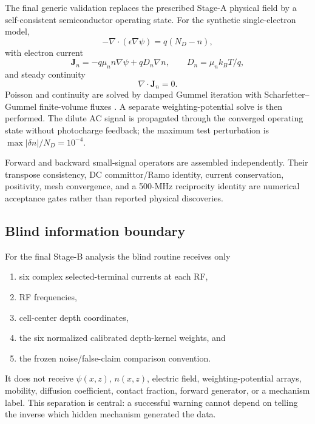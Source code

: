 \documentclass[11pt]{article}
\begin{document}
The final generic validation replaces the prescribed Stage-A physical field by a self-consistent semiconductor operating state. For the synthetic single-electron model,
\begin{equation}
-\nabla\!\cdot(\epsilon\nabla\psi)=q(N_D-n),
\label{eq:poisson}
\end{equation}
with electron current
\begin{equation}
\bm J_n=-q\mu_n n\nabla\psi+qD_n\nabla n,
\qquad D_n=\mu_n k_BT/q,
\label{eq:current}
\end{equation}
and steady continuity
\begin{equation}
\nabla\!\cdot\bm J_n=0.
\label{eq:continuity}
\end{equation}
Poisson and continuity are solved by damped Gummel iteration with Scharfetter--Gummel finite-volume fluxes \cite{Gummel1964,ScharfetterGummel1969}. A separate weighting-potential solve is then performed. The dilute AC signal is propagated through the converged operating state without photocharge feedback; the maximum test perturbation is $\max|\delta n|/N_D=10^{-4}$.

Forward and backward small-signal operators are assembled independently. Their transpose consistency, DC committor/Ramo identity, current conservation, positivity, mesh convergence, and a 500-MHz reciprocity identity are numerical acceptance gates rather than reported physical discoveries.

\subsection{Blind information boundary}

For the final Stage-B analysis the blind routine receives only
\begin{enumerate}[label=(\roman*)]
\item six complex selected-terminal currents at each RF,
\item RF frequencies,
\item cell-center depth coordinates,
\item the six normalized calibrated depth-kernel weights, and
\item the frozen noise/false-claim comparison convention.
\end{enumerate}
It does not receive $\psi(x,z)$, $n(x,z)$, electric field, weighting-potential arrays, mobility, diffusion coefficient, contact fraction, forward generator, or a mechanism label. This separation is central: a successful warning cannot depend on telling the inverse which hidden mechanism generated the data.
\end{document}
